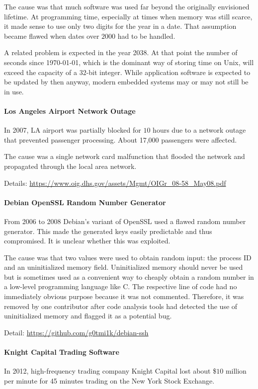 The cause was that much software was used far beyond the originally envisioned lifetime.
At programming time, especially at times when memory was still scarce, it made sense to use only two digits for the year in a date.
That assumption became flawed when dates over $2000$ had to be handled.

A related problem is expected in the year 2038.
At that point the number of seconds since 1970-01-01, which is the dominant way of storing time on Unix, will exceed the capacity of a $32$-bit integer.
While application software is expected to be updated by then anyway, modern embedded systems may or may not still be in use.

\paragraph{Los Angeles Airport Network Outage}
In 2007, LA airport was partially blocked for $10$ hours due to a network outage that prevented passenger processing.
About 17,000 passengers were affected.

The cause was a single network card malfunction that flooded the network and propagated through the local area network.

Details: \url{https://www.oig.dhs.gov/assets/Mgmt/OIGr_08-58_May08.pdf}

\paragraph{Debian OpenSSL Random Number Generator}
From 2006 to 2008 Debian's variant of OpenSSL used a flawed random number generator.
This made the generated keys easily predictable and thus compromised.
It is unclear whether this was exploited.

The cause was that two values were used to obtain random input: the process ID and an uninitialized memory field.
Uninitialized memory should never be used but is sometimes used as a convenient way to cheaply obtain a random number in a low-level programming language like C.
The respective line of code had no immediately obvious purpose because it was not commented.
Therefore, it was removed by one contributor after code analysis tools had detected the use of uninitialized memory and flagged it as a potential bug.

Detail: \url{https://github.com/g0tmi1k/debian-ssh}

\paragraph{Knight Capital Trading Software}
In 2012, high-frequency trading company Knight Capital lost about \$$10$ million per minute for 45 minutes trading on the New York Stock Exchange.


